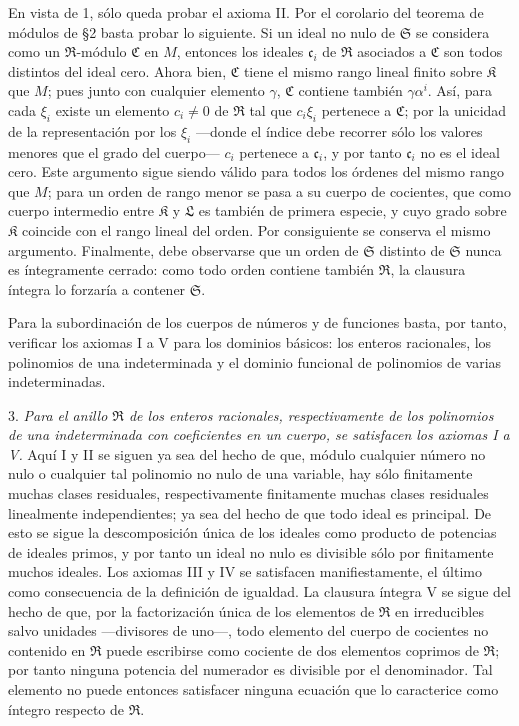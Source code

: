 \documentclass[11pt]{article}
\providecommand{\mR}{\mathfrak{R}}
\providecommand{\mK}{\mathfrak{K}}
\providecommand{\mL}{\mathfrak{L}}
\providecommand{\mS}{\mathfrak{S}}
\providecommand{\mC}{\mathfrak{C}}
\providecommand{\mc}{\mathfrak{c}}
\begin{document}
En vista de 1, sólo queda probar el axioma II. Por el corolario del teorema de módulos de §2 basta probar lo siguiente. Si un ideal no nulo de $\mS$ se considera como un $\mR$-módulo $\mC$ en $M$, entonces los ideales $\mc_i$ de $\mR$ asociados a $\mC$ son todos distintos del ideal cero. Ahora bien, $\mC$ tiene el mismo rango lineal finito sobre $\mK$ que $M$; pues junto con cualquier elemento $\gamma$, $\mC$ contiene también $\gamma\alpha^i$. Así, para cada $\xi_i$ existe un elemento $c_i\ne0$ de $\mR$ tal que $c_i\xi_i$ pertenece a $\mC$; por la unicidad de la representación por los $\xi_i$ ---donde el índice debe recorrer sólo los valores menores que el grado del cuerpo--- $c_i$ pertenece a $\mc_i$, y por tanto $\mc_i$ no es el ideal cero. Este argumento sigue siendo válido para todos los órdenes del mismo rango que $M$; para un orden de rango menor se pasa a su cuerpo de cocientes, que como cuerpo intermedio entre $\mK$ y $\mL$ es también de primera especie, y cuyo grado sobre $\mK$ coincide con el rango lineal del orden. Por consiguiente se conserva el mismo argumento. Finalmente, debe observarse que un orden de $\mS$ distinto de $\mS$ nunca es íntegramente cerrado: como todo orden contiene también $\mR$, la clausura íntegra lo forzaría a contener $\mS$.

Para la subordinación de los cuerpos de números y de funciones basta, por tanto, verificar los axiomas I a V para los dominios básicos: los enteros racionales, los polinomios de una indeterminada y el dominio funcional de polinomios de varias indeterminadas.

3. \emph{Para el anillo $\mR$ de los enteros racionales, respectivamente de los polinomios de una indeterminada con coeficientes en un cuerpo, se satisfacen los axiomas I a V.} Aquí I y II se siguen ya sea del hecho de que, módulo cualquier número no nulo o cualquier tal polinomio no nulo de una variable, hay sólo finitamente muchas clases residuales, respectivamente finitamente muchas clases residuales linealmente independientes; ya sea del hecho de que todo ideal es principal. De esto se sigue la descomposición única de los ideales como producto de potencias de ideales primos, y por tanto un ideal no nulo es divisible sólo por finitamente muchos ideales. Los axiomas III y IV se satisfacen manifiestamente, el último como consecuencia de la definición de igualdad. La clausura íntegra V se sigue del hecho de que, por la factorización única de los elementos de $\mR$ en irreducibles salvo unidades ---divisores de uno---, todo elemento del cuerpo de cocientes no contenido en $\mR$ puede escribirse como cociente de dos elementos coprimos de $\mR$; por tanto ninguna potencia del numerador es divisible por el denominador. Tal elemento no puede entonces satisfacer ninguna ecuación que lo caracterice como íntegro respecto de $\mR$.
\end{document}
